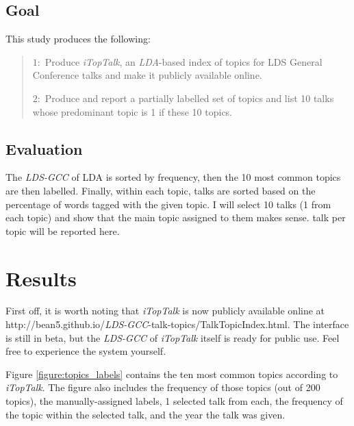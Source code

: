 \subsection {Goal}
This study produces the following:
\begin{quote}
	${1}:$ Produce \emph{iTopTalk}, an \emph{LDA}-based index of topics for LDS General Conference talks and make it publicly available online.
    
	${2}:$ Produce and report a partially labelled set of topics and list 10 talks whose predominant topic is 1 if these 10 topics.
\end{quote}

\subsection{Evaluation}
The \emph{LDS-GCC} of LDA is sorted by frequency, then the 10 most common topics are then labelled. Finally, within each topic, talks are sorted based on the percentage of words tagged with the given topic. I will select 10 talks (1 from each topic) and show that the main topic assigned to them makes sense.  talk per topic will be reported here. 

\section{Results}

First off, it is worth noting that \emph{iTopTalk} is now publicly available online at http://bean5.github.io/\emph{LDS-GCC}-talk-topics/TalkTopicIndex.html. The interface is still in beta, but the \emph{LDS-GCC} of \emph{iTopTalk} itself is ready for public use. Feel free to experience the system yourself.

Figure \ref{figure:topics_labels} contains the ten most common topics according to \emph{iTopTalk}. The figure also includes the frequency of those topics (out of 200 topics), the manually-assigned labels, 1 selected talk from each, the frequency of the topic within the selected talk, and the year the talk was given.

